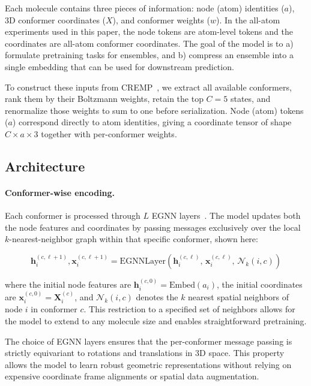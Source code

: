 \documentclass{article}
\begin{document}
Each molecule contains three pieces of information: node (atom) identities ($a$), 3D conformer coordinates ($X$), and conformer weights ($w$). In the all-atom experiments used in this paper, the node tokens are atom-level tokens and the coordinates are all-atom conformer coordinates. The goal of the model is to a) formulate pretraining tasks for ensembles, and b) compress an ensemble into a single embedding that can be used for downstream prediction.

To construct these inputs from CREMP~\citep{grambow2024cremp}, we extract all available conformers, rank them by their Boltzmann weights, retain the top $C=5$ states, and renormalize those weights to sum to one before serialization. Node (atom) tokens ($a$) correspond directly to atom identities, giving a coordinate tensor of shape $C \times a \times 3$ together with per-conformer weights.

\subsection{Architecture}
\label{sec:arch}

\paragraph{Conformer-wise encoding.}
Each conformer is processed through $L$ EGNN layers~\citep{satorras2021en}. The model updates both the node features and coordinates by passing messages exclusively over the local $k$-nearest-neighbor graph within that specific conformer, shown here:

\begin{equation}
  \mathbf{h}_i^{(c,\ell+1)}, \mathbf{x}_i^{(c,\ell+1)}
  = \mathrm{EGNNLayer}\!\left(
      \mathbf{h}_i^{(c,\ell)},\,
      \mathbf{x}_i^{(c,\ell)},\,
      \mathcal{N}_k(i, c)
    \right)
\end{equation}

where the initial node features are $\mathbf{h}_i^{(c,0)} = \mathrm{Embed}(a_i)$, the initial coordinates are $\mathbf{x}_i^{(c,0)} = \mathbf{X}_i^{(c)}$, and $\mathcal{N}_k(i,c)$ denotes the $k$ nearest spatial neighbors of node $i$ in conformer $c$. This restriction to a specified set of neighbors allows for the model to extend to any molecule size and enables straightforward pretraining.

The choice of EGNN layers ensures that the per-conformer message passing is strictly equivariant to rotations and translations in 3D space. This property allows the model to learn robust geometric representations without relying on expensive coordinate frame alignments or spatial data augmentation.
\end{document}
